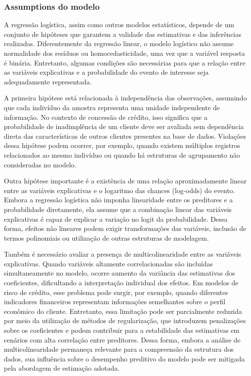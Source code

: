 \documentclass[
  brazilian,
  12pt,
  letterpaper,
  DIV=11,
  numbers=noendperiod]{scrartcl}
\begin{document}
\subsubsection{Assumptions do modelo}\label{assumptions-do-modelo}

A regressão logística, assim como outros modelos estatísticos, depende
de um conjunto de hipóteses que garantem a validade das estimativas e
das inferências realizadas. Diferentemente da regressão linear, o modelo
logístico não assume normalidade dos resíduos ou homocedasticidade, uma
vez que a variável resposta é binária. Entretanto, algumas condições são
necessárias para que a relação entre as variáveis explicativas e a
probabilidade do evento de interesse seja adequadamente representada.

A primeira hipótese está relacionada à independência das observações,
assumindo que cada indivíduo da amostra representa uma unidade
independente de informação. No contexto de concessão de crédito, isso
significa que a probabilidade de inadimplência de um cliente deve ser
avaliada sem dependência direta das características de outros clientes
presentes na base de dados. Violações dessa hipótese podem ocorrer, por
exemplo, quando existem múltiplos registros relacionados ao mesmo
indivíduo ou quando há estruturas de agrupamento não consideradas no
modelo.

Outra hipótese importante é a existência de uma relação aproximadamente
linear entre as variáveis explicativas e o logaritmo das chances
(log-odds) do evento. Embora a regressão logística não imponha
linearidade entre os preditores e a probabilidade diretamente, ela
assume que a combinação linear das variáveis explicativas é capaz de
explicar a variação no logit da probabilidade. Dessa forma, efeitos não
lineares podem exigir transformações das variáveis, inclusão de termos
polinomiais ou utilização de outras estruturas de modelagem.

Também é necessário avaliar a presença de multicolinearidade entre as
variáveis explicativas. Quando variáveis altamente correlacionadas são
incluídas simultaneamente no modelo, ocorre aumento da variância das
estimativas dos coeficientes, dificultando a interpretação individual
dos efeitos. Em modelos de risco de crédito, esse problema pode surgir,
por exemplo, quando diferentes indicadores financeiros representam
informações semelhantes sobre o perfil econômico do cliente. Entretanto,
essa limitação pode ser parcialmente reduzida por meio da utilização de
métodos de regularização, que introduzem penalizações sobre os
coeficientes e podem contribuir para a estabilidade das estimativas em
cenários com alta correlação entre preditores. Dessa forma, embora a
análise de multicolinearidade permaneça relevante para a compreensão da
estrutura dos dados, sua influência sobre o desempenho preditivo do
modelo pode ser mitigada pela abordagem de estimação adotada.
\end{document}
